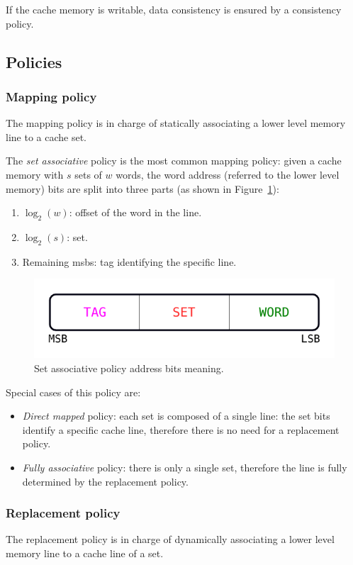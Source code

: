 \documentclass[11pt,a4paper,oneside]{memoir}
\begin{document}
If the cache memory is writable, data consistency is ensured by a consistency
policy.
\subsection{Policies}
\subsubsection{Mapping policy}
The mapping policy is in charge of statically associating a lower level memory
line to a cache set.

The \emph{set associative} policy is the most common mapping policy: given a
cache memory with $s$ sets of $w$ words, the word address (referred to the lower
level memory) bits are split into three parts (as shown in
Figure~\ref{fig:address_partitioning}):
\begin{enumerate}
	\item $\log_2(w)$: offset of the word in the line.
	\item $\log_2(s)$: set.
	\item Remaining \acsp{msb}: tag identifying the specific line.
\end{enumerate}

\begin{figure}[!htb]
	\centering
	\includegraphics[width=.5\textwidth]{address_partitioning}
	\caption{Set associative policy address bits meaning.}
	\label{fig:address_partitioning}
\end{figure}

Special cases of this policy are:
\begin{itemize}
	\item \emph{Direct mapped} policy: each set is composed of a single
		line: the set bits identify a specific cache line, therefore
		there is no need for a replacement policy.
	\item \emph{Fully associative} policy: there is only a single set,
		therefore the line is fully determined by the replacement
		policy.
\end{itemize}

\subsubsection{Replacement policy}
The replacement policy is in charge of dynamically associating a lower level
memory line to a cache line of a set.
\end{document}
